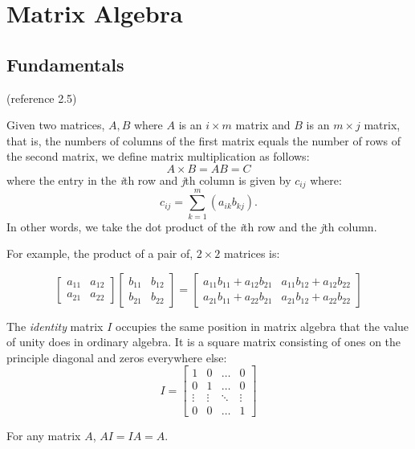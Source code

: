 \documentclass[
]{book}
\begin{document}
\hypertarget{matrix-algebra}{%
\section{Matrix Algebra}\label{matrix-algebra}}

\hypertarget{fundamentals}{%
\subsection{Fundamentals}\label{fundamentals}}

(reference 2.5)

Given two matrices, \(A, B\) where \(A\) is an \(i \times m\) matrix and \(B\) is an \(m \times j\) matrix, that is, the numbers of columns of the first matrix equals the number of rows of the second matrix, we define matrix multiplication as follows:
\[A \times B = A B = C\] where the entry in the \emph{i}th row and \emph{j}th column is given by \(c_{ij}\) where:
\[c_{ij} = \sum_{k=1}^m (a_{ik}b_{kj}).\]
In other words, we take the dot product of the \emph{i}th row and the \emph{j}th column.

For example, the product of a pair of, \(2 \times 2\) matrices is:

\[
\begin{bmatrix} 
a_{11} & a_{12} \\ 
a_{21} & a_{22} 
\end{bmatrix} 
\begin{bmatrix} 
b_{11} & b_{12} \\ 
b_{21} & b_{22} 
\end{bmatrix} 
= 
\begin{bmatrix} 
a_{11}b_{11}+a_{12}b_{21} & a_{11}b_{12}+a_{12}b_{22} \\ 
a_{21}b_{11}+a_{22}b_{21} & a_{21}b_{12}+a_{22}b_{22} 
\end{bmatrix} 
\]

The \emph{identity} matrix \(I\) occupies the same position in matrix algebra that the value of unity does in ordinary algebra. It is a square matrix consisting of ones on the principle diagonal and zeros everywhere else:
\[I =
\begin{bmatrix}
1 & 0 & \dots & 0 \\
0 & 1 & \dots & 0 \\
\vdots & \vdots & \ddots & \vdots\\
0 & 0 & \dots & 1
\end{bmatrix}
\]

For any matrix \(A\), \(A I = I A = A\).
\end{document}
